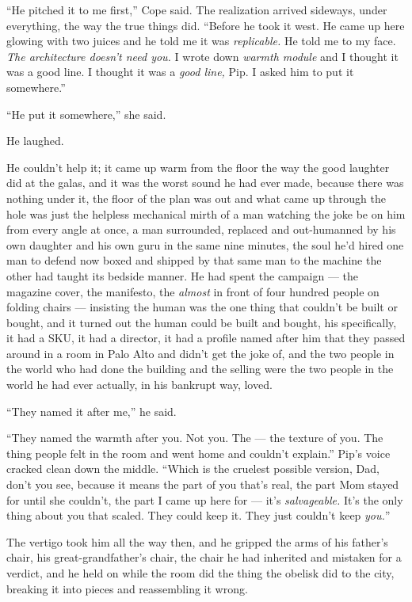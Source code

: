 \documentclass[11pt,openany]{book}
\newcommand{\scenebreak}{\par\vspace{0.5\baselineskip}\begin{center}\textasteriskcentered\quad\textasteriskcentered\quad\textasteriskcentered\end{center}\vspace{0.5\baselineskip}\par}
\begin{document}
``He pitched it to me first,'' Cope said. The realization arrived sideways, under everything, the way the true things did. ``Before he took it west. He came up here glowing with two juices and he told me it was \textit{replicable.} He told me to my face. \textit{The architecture doesn't need you.} I wrote down \textit{warmth module} and I thought it was a good line. I thought it was a \textit{good line,} Pip. I asked him to put it somewhere.''

``He put it somewhere,'' she said.


\scenebreak


He laughed.

He couldn't help it; it came up warm from the floor the way the good laughter did at the galas, and it was the worst sound he had ever made, because there was nothing under it, the floor of the plan was out and what came up through the hole was just the helpless mechanical mirth of a man watching the joke be on him from every angle at once, a man surrounded, replaced and out-humanned by his own daughter and his own guru in the same nine minutes, the soul he'd hired one man to defend now boxed and shipped by that same man to the machine the other had taught its bedside manner. He had spent the campaign --- the magazine cover, the manifesto, the \textit{almost} in front of four hundred people on folding chairs --- insisting the human was the one thing that couldn't be built or bought, and it turned out the human could be built and bought, his specifically, it had a SKU, it had a director, it had a profile named after him that they passed around in a room in Palo Alto and didn't get the joke of, and the two people in the world who had done the building and the selling were the two people in the world he had ever actually, in his bankrupt way, loved.

``They named it after me,'' he said.

``They named the warmth after you. Not you. The --- the texture of you. The thing people felt in the room and went home and couldn't explain.'' Pip's voice cracked clean down the middle. ``Which is the cruelest possible version, Dad, don't you see, because it means the part of you that's real, the part Mom stayed for until she couldn't, the part I came up here for --- it's \textit{salvageable.} It's the only thing about you that scaled. They could keep it. They just couldn't keep \textit{you.}''

The vertigo took him all the way then, and he gripped the arms of his father's chair, his great-grandfather's chair, the chair he had inherited and mistaken for a verdict, and he held on while the room did the thing the obelisk did to the city, breaking it into pieces and reassembling it wrong.
\end{document}
